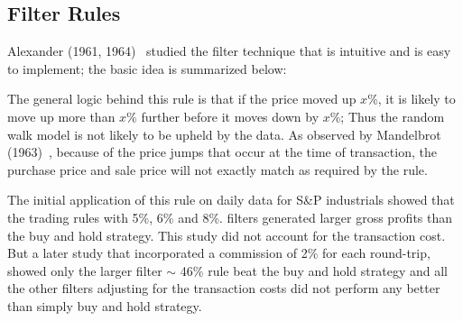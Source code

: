 \subsection{Filter Rules}


Alexander (1961, 1964)~\cite{alexander61,alexander64} studied the filter technique that is intuitive and is easy to implement; the basic idea is summarized below: \twomedskip


 \twomedskip


The general logic behind this rule is that if the price moved up $x$\%, it is likely to move up more than $x$\% further before it moves down by $x$\%; Thus the random walk model is not likely to be upheld by the data. As observed by Mandelbrot (1963)~\cite{mandelbrot}, because of the price jumps that occur at the time of transaction, the purchase price and sale price will not exactly match as required by the rule.


The initial application of this rule on daily data for S\&P industrials showed that the trading rules with 5\%, 6\% and 8\%. filters generated larger gross profits than the buy and hold strategy. This study did not account for the transaction cost. But a later study that incorporated a commission of 2\% for each round-trip, showed only the larger filter  $\sim$ 46\% rule beat the buy and hold strategy and all the other filters adjusting for the transaction costs did not perform any better than simply buy and hold  strategy. 



